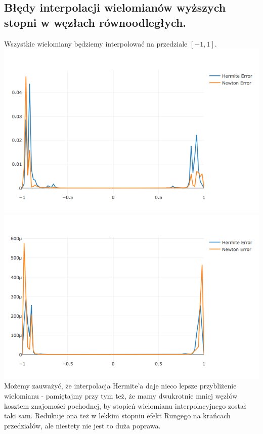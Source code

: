 \documentclass[10pt,wide]{mwart}
\theoremstyle{definition}
\begin{document}
\subsection{Błędy interpolacji wielomianów wyższych stopni w węzłach równoodległych.}
Wszystkie wielomiany będziemy interpolować na przedziale \([-1,1]\). \\
\includegraphics[scale=0.7]{polytesta.png}
\includegraphics[scale=0.7]{polytestb.png}
Możemy zauważyć, że interpolacja Hermite'a daje nieco lepsze przybliżenie wielomianu - pamiętajmy przy tym też, że mamy dwukrotnie mniej węzłów kosztem znajomości pochodnej, by stopień wielomianu interpolacyjnego został taki sam.
Redukuje ona też w lekkim stopniu efekt Rungego na krańcach przedziałów, ale niestety nie jest to duża poprawa.
\end{document}
